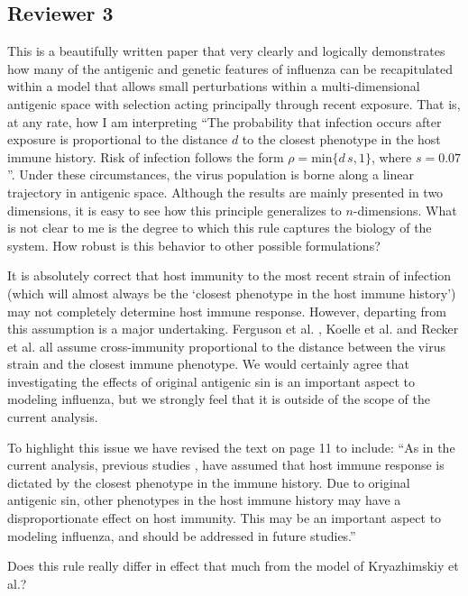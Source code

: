 \documentclass[11pt,oneside,letterpaper]{article}
\def\comment#1{
#1
}
\def\response#1{
\begin{bf}
#1
\end{bf}
}
\def\break{\vspace{0.2cm}}
\begin{document}
\subsection*{Reviewer 3}

\comment{This is a beautifully written paper that very clearly and logically demonstrates how many of the antigenic and genetic features of influenza can be recapitulated within a model that allows small perturbations within a multi-dimensional antigenic space with selection acting principally through recent exposure. That is, at any rate, how I am interpreting ``The probability that infection occurs after exposure is proportional to the distance $d$ to the closest phenotype in the host immune history. Risk of infection follows the form $\rho = \textrm{min}\{d\,s,1\}$, where $s=0.07$''. Under these circumstances, the virus population is borne along a linear trajectory in antigenic space. Although the results are mainly presented in two dimensions, it is easy to see how this principle generalizes to $n$-dimensions. What is not clear to me is the degree to which this rule captures the biology of the system. How robust is this behavior to other possible formulations?}

\response{It is absolutely correct that host immunity to the most recent strain of infection (which will almost always be the `closest phenotype in the host immune history') may not completely determine host immune response.  However, departing from this assumption is a major undertaking.  Ferguson et al. \cite{Ferguson03}, Koelle et al. \cite{Koelle06} and Recker et al. \cite{Recker07} all assume cross-immunity proportional to the distance between the virus strain and the closest immune phenotype.  We would certainly agree that investigating the effects of original antigenic sin is an important aspect to modeling influenza, but we strongly feel that it is outside of the scope of the current analysis.}

\response{To highlight this issue we have revised the text on page 11 to include: ``As in the current analysis, previous studies \cite{Ferguson03,Koelle06,Recker07}, have assumed that host immune response is dictated by the closest phenotype in the immune history.  Due to original antigenic sin, other phenotypes in the host immune history may have a disproportionate effect on host immunity.  This may be an important aspect to modeling influenza, and should be addressed in future studies.''}

\break

\comment{Does this rule really differ in effect that much from the model of Kryazhimskiy et al.?}
\end{document}
